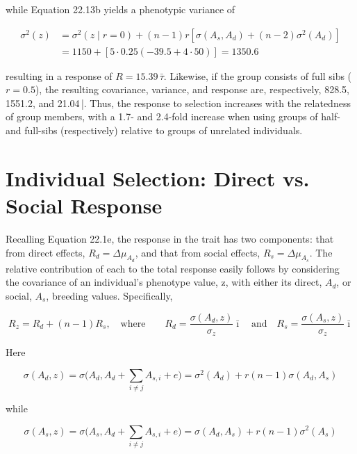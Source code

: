 \documentclass{article}
\begin{document}
while Equation 22.13b yields a phenotypic variance of

\begin{equation}
\begin{aligned}\sigma^{2}(z)&=\sigma^{2}(z\mid r=0)+(n-1)r\left[\sigma(A_{s},A_{d})+(n-2)\sigma^{2}(A_{d})\right]\\&=1150+\left[5\cdot0.25(-39.5+4\cdot50)\right]=1350.6\end{aligned}
\end{equation}

resulting in a response of  $ R = 15.39\,\bar{\tau} $. Likewise, if the group consists of full sibs ( $ r = 0.5 $), the resulting covariance, variance, and response are, respectively, 828.5, 1551.2, and 21.04\,\bar{\tau}. Thus, the response to selection increases with the relatedness of group members, with a 1.7- and 2.4-fold increase when using groups of half- and full-sibs (respectively) relative to groups of unrelated individuals.

\section{Individual Selection: Direct vs. Social Response}
Recalling Equation 22.1e, the response in the trait has two components: that from direct effects,  $ R_d = \Delta \mu_{A_d} $, and that from social effects,  $ R_s = \Delta \mu_{A_s} $. The relative contribution of each to the total response easily follows by considering the covariance of an individual's phenotype value, z, with either its direct,  $ A_d $, or social,  $ A_s $, breeding values. Specifically,

\begin{equation}
R_{z}=R_{d}+(n-1)R_{s},\quad\mathrm{w h e r e}\qquad R_{d}=\frac{\sigma(A_{d},z)}{\sigma_{z}}\bar{\imath}\quad\mathrm{a n d}\quad R_{s}=\frac{\sigma(A_{s},z)}{\sigma_{z}}\bar{\imath}
\tag{22.15a}
\label{eq:22_15a}
\end{equation}

Here

\begin{equation}
\sigma(A_{d},z)=\sigma\Biggl(A_{d},A_{d}+\sum_{i\neq j}A_{s,i}+e\Biggr)=\sigma^{2}(A_{d})+r(n-1)\sigma(A_{d},A_{s})
\tag{22.15b}
\label{eq:22_15b}
\end{equation}

while

\begin{equation}
\sigma(A_{s},z)=\sigma\Biggl(A_{s},A_{d}+\sum_{i\neq j}A_{s,i}+e\Biggr)=\sigma(A_{d},A_{s})+r(n-1)\sigma^{2}(A_{s})
\tag{22.15c}
\label{eq:22_15c}
\end{equation}
\end{document}
